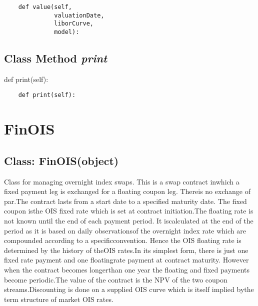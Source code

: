 \documentclass[twoside,11pt]{book}
\begin{document}
\begin{lstlisting}
    def value(self,
              valuationDate,
              liborCurve,
              model):
\end{lstlisting}

\subsection{Class Method {\it print}}
def print(self):

\begin{lstlisting}
    def print(self):
\end{lstlisting}

\newpage
\section{FinOIS}

\subsection{Class: FinOIS(object)}
Class for managing overnight index swaps. This is a swap contract inwhich a fixed payment leg is exchanged for a floating coupon leg. Thereis no exchange of par.The contract lasts from a start date to a specified maturity date. The fixed coupon isthe OIS fixed rate which is set at contract initiation.The floating rate is not known until the end of each payment period. It iscalculated at the end of the period as it is based on daily observationsof the overnight index rate which are compounded according to a specificconvention. Hence the OIS floating rate is determined by the history of theOIS rates.In its simplest form, there is just one fixed rate payment and one floatingrate payment at contract maturity. However when the contract becomes longerthan one year the floating and fixed payments become periodic.The value of the contract is the NPV of the two coupon streams.Discounting is done on a supplied OIS curve which is itself implied bythe term structure of market OIS rates. 
\end{document}
